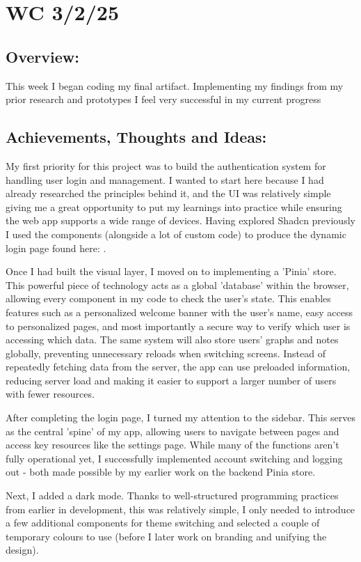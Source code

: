 \section{WC 3/2/25}

\subsection*{Overview:}
This week I began coding my final artifact. Implementing my findings from my prior research and prototypes I feel very successful in my current progress

\subsection*{Achievements, Thoughts and Ideas:}
My first priority for this project was to build the authentication system for handling user login and management. I wanted to start here because I had already researched the principles behind it, and the UI was relatively simple giving me a great opportunity to put my learnings into practice while ensuring the web app supports a wide range of devices. Having explored Shadcn previously I used the components (alongside a lot of custom code) to produce the dynamic login page found here: .

Once I had built the visual layer, I moved on to implementing a 'Pinia' store. This powerful piece of technology acts as a global 'database' within the browser, allowing every component in my code to check the user's state. This enables features such as a personalized welcome banner with the user's name, easy access to personalized pages, and most importantly a secure way to verify which user is accessing which data. The same system will also store users' graphs and notes globally, preventing unnecessary reloads when switching screens. Instead of repeatedly fetching data from the server, the app can use preloaded information, reducing server load and making it easier to support a larger number of users with fewer resources.

After completing the login page, I turned my attention to the sidebar. This serves as the central 'spine' of my app, allowing users to navigate between pages and access key resources like the settings page. While many of the functions aren't fully operational yet, I successfully implemented account switching and logging out - both made possible by my earlier work on the backend Pinia store.

Next, I added a dark mode. Thanks to well-structured programming practices from earlier in development, this was relatively simple, I only needed to introduce a few additional components for theme switching and selected a couple of temporary colours to use (before I later work on branding and unifying the design).

